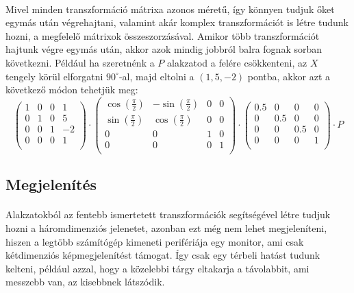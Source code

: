 \documentclass{elteikthesis}
\begin{document}
\paragraph{}
Mivel minden transzformáció mátrixa azonos méretű, így könnyen tudjuk őket egymás után végrehajtani, valamint akár komplex transzformációt is létre tudunk hozni, a megfelelő mátrixok összeszorzásával. Amikor több transzformációt hajtunk végre egymás után, akkor azok mindig jobbról balra fognak sorban következni. Például ha szeretnénk a $P$ alakzatod a felére csökkenteni, az $X$ tengely körül elforgatni $90^{\circ}$-al, majd eltolni a $(1,5,-2)$ pontba, akkor azt a következő módon tehetjük meg:
$$
\left( \begin{array}{cccc}
	1 & 0 & 0 & 1 \\
	0 & 1 & 0 & 5 \\
	0 & 0 & 1 & -2 \\
	0 & 0 & 0 & 1 \\
\end{array} \right)
\cdot
\left( \begin{array}{cccc}
	\cos(\frac{\pi}{2}) & -\sin(\frac{\pi}{2}) & 0 & 0 \\
	\sin(\frac{\pi}{2}) & \cos(\frac{\pi}{2}) & 0 & 0 \\
	0 & 0 & 1 & 0 \\
	0 & 0 & 0 & 1 \\
\end{array} \right)
\cdot
\left( \begin{array}{cccc}
	0.5 & 0 & 0 & 0 \\
	0 & 0.5 & 0 & 0 \\
	0 & 0 & 0.5 & 0 \\
	0 & 0 & 0 & 1 \\
\end{array} \right)
\cdot
P
$$
\subsection{Megjelenítés}
\paragraph{}
Alakzatokból az fentebb ismertetett transzformációk segítségével létre tudjuk hozni a háromdimenziós jelenetet, azonban ezt még nem lehet megjeleníteni, hiszen a legtöbb számítógép kimeneti perifériája egy monitor, ami csak kétdimenziós képmegjelenítést támogat. Így csak egy térbeli hatást tudunk kelteni, például azzal, hogy a közelebbi tárgy eltakarja a távolabbit, ami messzebb van, az kisebbnek látszódik.
\end{document}
